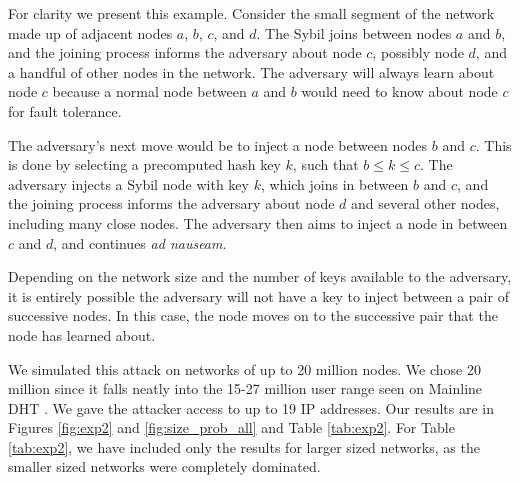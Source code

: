 \documentclass[11pt,conference]{IEEEtran}
\begin{document}
For clarity we present this example. 
Consider the small segment of the network made up of adjacent nodes $a$, $b$, $c$, and $d$.
The Sybil joins between nodes $a$ and $b$, and the joining process informs the adversary about node $c$, possibly node $d$, and a handful of other nodes in the network.
The adversary will always learn about node $c$ because a normal node between $a$ and $b$ would need to know about node $c$ for fault tolerance.

The adversary's next move would be to inject a node between nodes $b$ and $c$.
This is done by selecting a precomputed hash key $k$, such that $b \leq k \leq c$.
The adversary injects a Sybil node with key $k$, which joins in between $b$ and $c$, and the joining process informs the adversary about node $d$ and several other nodes, including many close nodes.
The adversary then aims to inject a node in between $c$ and $d$, and continues \textit{ad nauseam}.  %

Depending on the network size and the number of keys available to the adversary, it is entirely possible the adversary will not have a key to inject between a pair of successive nodes.
In this case, the node moves on to the successive pair that the node has learned about.

We simulated this attack on networks of up to 20 million nodes.
We chose 20 million since it falls neatly into the 15-27 million user range seen on Mainline DHT \cite{mainlineMeasure}.
We gave the attacker access to up to 19 IP addresses.
Our results are in Figures \ref{fig:exp2} and \ref{fig:size_prob_all} and Table \ref{tab:exp2}.
For Table \ref{tab:exp2}, we have included only the results for larger sized networks, as the smaller sized networks were completely dominated.
\end{document}
